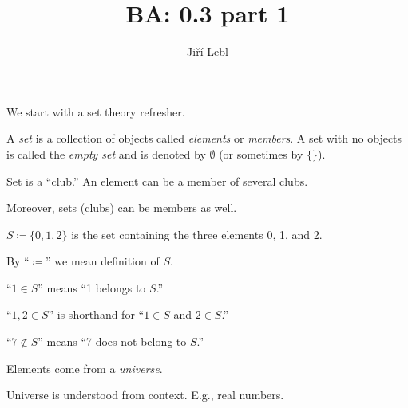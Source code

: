 \documentclass[10pt,aspectratio=169]{beamer}
\author{Ji\v{r}\'i Lebl}
\institute[OSU]{%
Departemento pri Matematiko de Oklahoma {\^S}tata Universitato}
\title{BA: 0.3 part 1}
\date{}
\begin{document}
\begin{frame}
\titlepage
\end{frame}

\begin{frame}
We start with a set theory refresher.

\pause

\begin{definition}
A \emph{set} is a collection of objects called
\emph{elements} or \emph{members}.  A set with
no objects is called the \emph{empty set} and is denoted by
$\emptyset$ (or sometimes by $\{ \}$).
\end{definition}

\pause

Set is a ``club.''  An element can be a member of
several clubs.

Moreover, sets (clubs) can be members as well.

\medskip
\pause

$S \coloneqq \{ 0, 1, 2 \}$
\quad is the set containing
the three elements 0, 1, and 2.

\medskip
\pause

By ``$\coloneqq$'' we mean definition of $S$.

\medskip
\pause

``$1 \in S$''
means ``1 belongs to $S$.''

\medskip
\pause

``$1,2 \in S$'' is shorthand for
``$1 \in S$ and $2 \in S$.''

\medskip
\pause

``$7 \notin S$'' means ``7 does not belong to $S$.''

\medskip
\pause

Elements come from a \emph{universe}.

\medskip
\pause

Universe is understood from context.  E.g., real numbers.

\end{frame}
\end{document}
